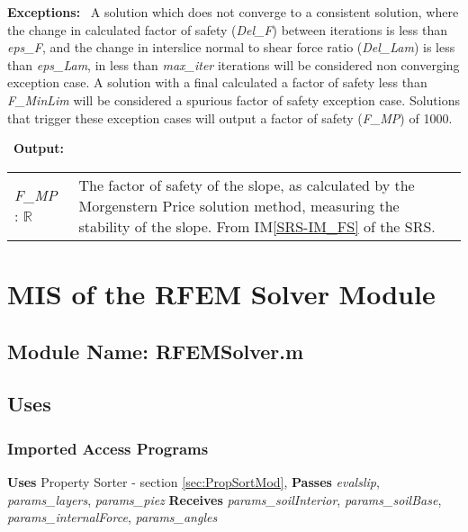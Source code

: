 \documentclass[12pt]{article}
\begin{document}
\noindent \textbf{Exceptions:} ~\newline\noindent A solution which
does not converge to a consistent solution, where the change in
calculated factor of safety (\textit{Del\_F}) between iterations is
less than \textit{eps\_F}, and the change in interslice normal to
shear force ratio (\textit{Del\_Lam}) is less than \textit{eps\_Lam},
in less than \textit{max\_iter} iterations will be considered non
converging exception case. A solution with a final calculated a factor
of safety less than \textit{F\_MinLim} will be considered a spurious
factor of safety exception case. Solutions that trigger these
exception cases will output a factor of safety (\textit{F\_MP}) of
1000.

~\newline\noindent \textbf{Output:}
\renewcommand*{\arraystretch}{1.5}
\begin{longtable}{p{} p{}}
  \textit{F\_MP} : $\mathbb{R}$ & The factor of safety of the slope,
  as calculated by the Morgenstern Price solution method, measuring
  the stability of the slope. From IM\ref{SRS-IM_FS} of the SRS.\\
\end{longtable}




\section{MIS of the RFEM Solver Module} \label{sec:RFEMMod}

\subsection{Module Name: RFEMSolver.m}

\subsection{Uses}

\subsubsection{Imported Access Programs}

\noindent
\textbf{Uses} Property Sorter - section \ref{sec:PropSortMod},
\textbf{Passes} \textit{evalslip}, \textit{params\_layers},
\textit{params\_piez} \textbf{Receives} \textit{params\_soilInterior},
\textit{params\_soilBase}, \textit{params\_internalForce},
\textit{params\_angles}
\end{document}
